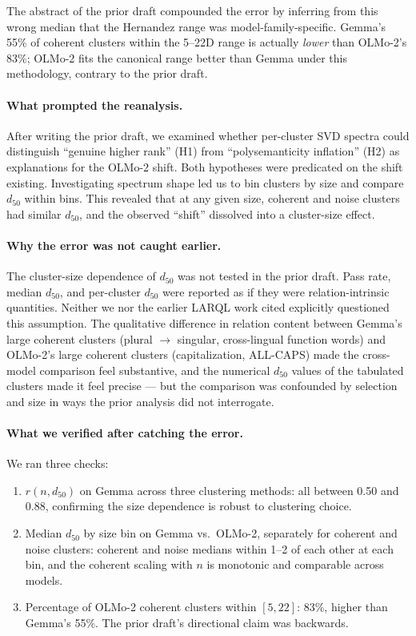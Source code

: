 \documentclass[11pt,letterpaper]{article}
\begin{document}
The abstract of the prior draft compounded the error by inferring from this wrong median that the Hernandez range was model-family-specific. Gemma's 55\% of coherent clusters within the 5--22D range is actually \emph{lower} than OLMo-2's 83\%; OLMo-2 fits the canonical range better than Gemma under this methodology, contrary to the prior draft.

\paragraph{What prompted the reanalysis.} After writing the prior draft, we examined whether per-cluster SVD spectra could distinguish ``genuine higher rank'' (H1) from ``polysemanticity inflation'' (H2) as explanations for the OLMo-2 shift. Both hypotheses were predicated on the shift existing. Investigating spectrum shape led us to bin clusters by size and compare $d_{50}$ within bins. This revealed that at any given size, coherent and noise clusters had similar $d_{50}$, and the observed ``shift'' dissolved into a cluster-size effect.

\paragraph{Why the error was not caught earlier.} The cluster-size dependence of $d_{50}$ was not tested in the prior draft. Pass rate, median $d_{50}$, and per-cluster $d_{50}$ were reported as if they were relation-intrinsic quantities. Neither we nor the earlier LARQL work cited explicitly questioned this assumption. The qualitative difference in relation content between Gemma's large coherent clusters (plural $\to$ singular, cross-lingual function words) and OLMo-2's large coherent clusters (capitalization, ALL-CAPS) made the cross-model comparison feel substantive, and the numerical $d_{50}$ values of the tabulated clusters made it feel precise --- but the comparison was confounded by selection and size in ways the prior analysis did not interrogate.

\paragraph{What we verified after catching the error.} We ran three checks:
\begin{enumerate}[leftmargin=*,itemsep=0pt]
\item $r(n, d_{50})$ on Gemma across three clustering methods: all between 0.50 and 0.88, confirming the size dependence is robust to clustering choice.
\item Median $d_{50}$ by size bin on Gemma vs.\ OLMo-2, separately for coherent and noise clusters: coherent and noise medians within 1--2 of each other at each bin, and the coherent scaling with $n$ is monotonic and comparable across models.
\item Percentage of OLMo-2 coherent clusters within $[5, 22]$: 83\%, higher than Gemma's 55\%. The prior draft's directional claim was backwards.
\end{enumerate}
\end{document}
